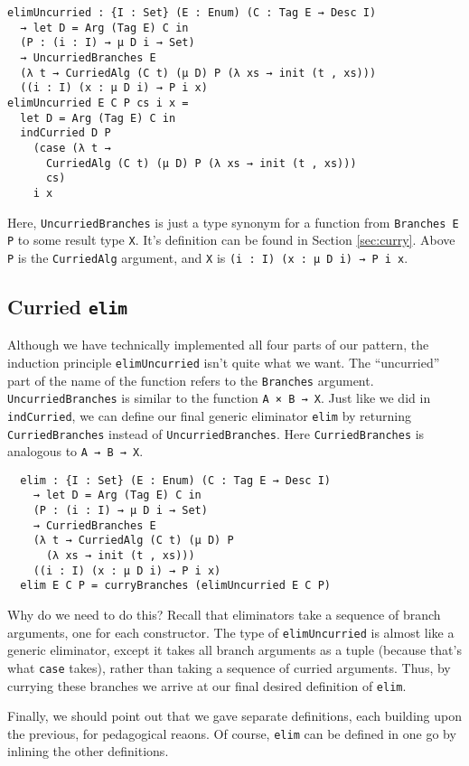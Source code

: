 \documentclass[preprint,nonatbib]{sigplanconf}
\begin{document}
\begin{verbatim}
elimUncurried : {I : Set} (E : Enum) (C : Tag E → Desc I)
  → let D = Arg (Tag E) C in
  (P : (i : I) → μ D i → Set)
  → UncurriedBranches E
  (λ t → CurriedAlg (C t) (μ D) P (λ xs → init (t , xs)))
  ((i : I) (x : μ D i) → P i x)
elimUncurried E C P cs i x =
  let D = Arg (Tag E) C in
  indCurried D P
    (case (λ t →
      CurriedAlg (C t) (μ D) P (λ xs → init (t , xs)))
      cs)
    i x
\end{verbatim}

Here, {\tt UncurriedBranches} is just a type synonym for a function
from {\tt Branches E P} to some result type {\tt X}.
It's definition can
be found in Section \ref{sec:curry}. 
Above {\tt P} is
the {\tt CurriedAlg} argument, and {\tt X} is
{\tt (i : I) (x : μ D i) → P i x}.

\subsection{Curried {\tt elim}}

Although we have technically implemented all four parts of our
pattern, the induction principle {\tt elimUncurried} isn't quite what
we want. The ``uncurried'' part of the name of the function refers to
the {\tt Branches} argument.
{\tt UncurriedBranches} is similar to the function
{\tt A × B → X}. Just like we did in {\tt indCurried}, we can define
our final generic eliminator {\tt elim} by returning
{\tt CurriedBranches} instead of {\tt UncurriedBranches}. Here
{\tt CurriedBranches} is analogous to {\tt A → B → X}.

\begin{verbatim}
  elim : {I : Set} (E : Enum) (C : Tag E → Desc I)
    → let D = Arg (Tag E) C in
    (P : (i : I) → μ D i → Set)
    → CurriedBranches E
    (λ t → CurriedAlg (C t) (μ D) P
      (λ xs → init (t , xs)))
    ((i : I) (x : μ D i) → P i x)
  elim E C P = curryBranches (elimUncurried E C P)
\end{verbatim}

Why do we need to do this? Recall that eliminators take a sequence of
branch arguments, one for each constructor. The type of
{\tt elimUncurried} is almost like a generic eliminator, except it
takes all branch arguments as a tuple (because that's what {\tt case}
takes), rather than taking a sequence of curried arguments. Thus, by
currying these branches we arrive at our final desired definition of
{\tt elim}.

Finally, we should point out that we gave separate definitions, each
building upon the previous, for pedagogical reaons. Of course, {\tt elim}
can be defined in one go by inlining the other definitions.
\end{document}
